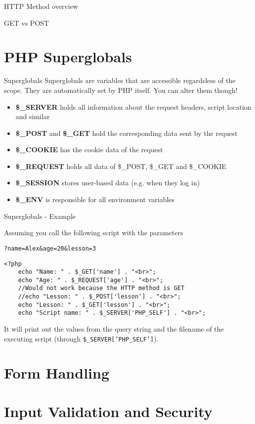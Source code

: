 \begin{frame}{HTTP Method overview}
\end{frame}

\begin{frame}{GET vs POST}
\end{frame}

\section{PHP Superglobals}

\begin{frame}[fragile]{Superglobals}
Superglobals are variables that are accessible regardsless of the scope. They are automatically set by PHP itself. You can alter them though!
	\pause
	
	\begin{itemize}
        \item \textbf{\$\_{}SERVER} holds all information about the request headers, script location and similar	
        \pause
		\item \textbf{\$\_{}POST} and \textbf{\$\_{}GET} hold the corresponding data sent by the request
		\pause
		\item \textbf{\$\_{}COOKIE} has the cookie data of the request
		\pause
		\item \textbf{\$\_{}REQUEST} holds all data of \$\_{}POST, \$\_{}GET and \$\_{}COOKIE
		\pause
		\item \textbf{\$\_{}SESSION} stores user-based data (e.g. when they log in)
		\pause
		\item \textbf{\$\_{}ENV} is responsible for all environment variables
	\end{itemize}
\end{frame}

\begin{frame}[fragile]{Superglobals - Example}

	Assuming you call the following script with the parameters 
	
	\texttt{?name=Alex\&{}age=20\&{}lesson=3}
	
	\begin{lstlisting}
<?php
	echo "Name: " . $_GET['name'] . "<br>";
	echo "Age: " . $_REQUEST['age'] . "<br>";
	//Would not work because the HTTP method is GET
	//echo "Lesson: " . $_POST['lesson'] . "<br>";
	echo "Lesson: " . $_GET['lesson'] . "<br>";
	echo "Script name: " . $_SERVER['PHP_SELF'] . "<br>";
	\end{lstlisting}
	
	It will print out the values from the query string and the filename of the executing script (through \texttt{\$\_{}SERVER['PHP\_{}SELF']}). 
\end{frame}

\section{Form Handling}

\section{Input Validation and Security}



